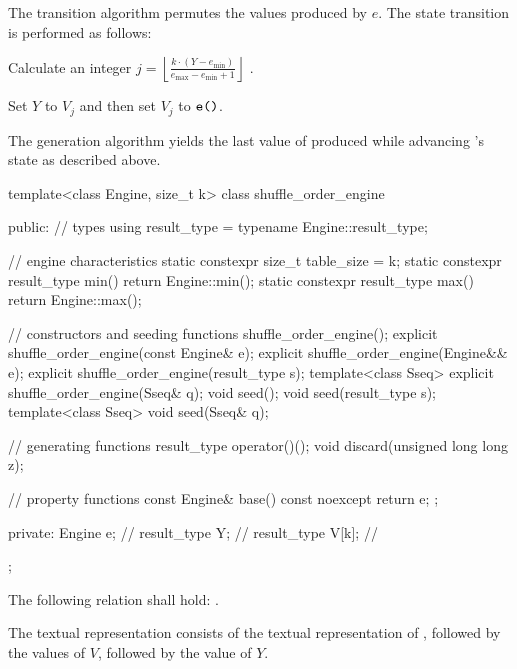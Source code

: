 \pnum
The transition algorithm%
%
permutes the values produced by $e$.
The state transition is performed as follows:
\begin{enumeratea}
 \item
   Calculate an integer
   $j = \left\lfloor \frac{k \cdot (Y - e_{\min})}
                          {e_{\max} - e_{\min} +1}
        \right\rfloor
   $%
   .
 \item
   Set $Y$ to $V_j$ and then set $V_j$ to $\texttt{e()}$.
\end{enumeratea}

\pnum
The generation algorithm%
%
yields the last value of 
 produced while advancing 's state as described above.

\begin{codeblock}
template<class Engine, size_t k>
 class shuffle_order_engine
{
public:
 // types
 using result_type = typename Engine::result_type;

 // engine characteristics
 static constexpr size_t table_size = k;
 static constexpr result_type min() { return Engine::min(); }
 static constexpr result_type max() { return Engine::max(); }

 // constructors and seeding functions
 shuffle_order_engine();
 explicit shuffle_order_engine(const Engine& e);
 explicit shuffle_order_engine(Engine&& e);
 explicit shuffle_order_engine(result_type s);
 template<class Sseq> explicit shuffle_order_engine(Sseq& q);
 void seed();
 void seed(result_type s);
 template<class Sseq> void seed(Sseq& q);

 // generating functions
 result_type operator()();
 void discard(unsigned long long z);

 // property functions
 const Engine& base() const noexcept { return e; };

private:
 Engine e;           // \expos
 result_type Y;      // \expos
 result_type V[k];   // \expos
};
\end{codeblock}

\pnum
The following relation shall hold:
  .

\pnum
The textual representation%
%
consists of
 the textual representation of ,
followed by
 the  values of $V$,
followed by
 the value of $Y$.

